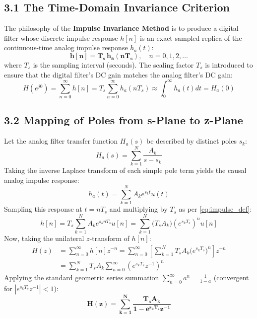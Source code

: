 \documentclass[11pt,a4paper]{article}
\begin{document}
\subsection{3.1 The Time-Domain Invariance Criterion}
The philosophy of the \textbf{Impulse Invariance Method} is to produce a digital filter whose discrete impulse response $h[n]$ is an exact sampled replica of the continuous-time analog impulse response $h_a(t)$:
\begin{equation}
\mathbf{h[n] = T_s \, h_a(n T_s)}, \quad n = 0, 1, 2, \dots
\label{eq:impulse_def}
\end{equation}
where $T_s$ is the sampling interval (seconds). The scaling factor $T_s$ is introduced to ensure that the digital filter's DC gain matches the analog filter's DC gain:
\begin{equation}
H(e^{j0}) = \sum_{n=0}^\infty h[n] = T_s \sum_{n=0}^\infty h_a(n T_s) \approx \int_0^\infty h_a(t) dt = H_a(0)
\end{equation}

\subsection{3.2 Mapping of Poles from s-Plane to z-Plane}
Let the analog filter transfer function $H_a(s)$ be described by distinct poles $s_k$:
\begin{equation}
H_a(s) = \sum_{k=1}^N \frac{A_k}{s - s_k}
\label{eq:ha_pfe}
\end{equation}
Taking the inverse Laplace transform of each simple pole term yields the causal analog impulse response:
\begin{equation}
h_a(t) = \sum_{k=1}^N A_k e^{s_k t} u(t)
\end{equation}
Sampling this response at $t = n T_s$ and multiplying by $T_s$ as per \eqref{eq:impulse_def}:
\begin{equation}
h[n] = T_s \sum_{k=1}^N A_k e^{s_k n T_s} u[n] = \sum_{k=1}^N \big(T_s A_k\big) \left(e^{s_k T_s}\right)^n u[n]
\end{equation}
Now, taking the unilateral $z$-transform of $h[n]$:
\begin{align}
H(z) &= \sum_{n=0}^\infty h[n] z^{-n} = \sum_{n=0}^\infty \left[ \sum_{k=1}^N T_s A_k \big(e^{s_k T_s}\big)^n \right] z^{-n} \nonumber \\
     &= \sum_{k=1}^N T_s A_k \sum_{n=0}^\infty \left( e^{s_k T_s} z^{-1} \right)^n
\end{align}
Applying the standard geometric series summation $\sum_{n=0}^\infty a^n = \frac{1}{1 - a}$ (convergent for $|e^{s_k T_s} z^{-1}| < 1$):
\begin{equation}
\mathbf{H(z) = \sum_{k=1}^N \frac{T_s A_k}{1 - e^{s_k T_s} z^{-1}}}
\label{eq:hz_pfe}
\end{equation}
\end{document}
